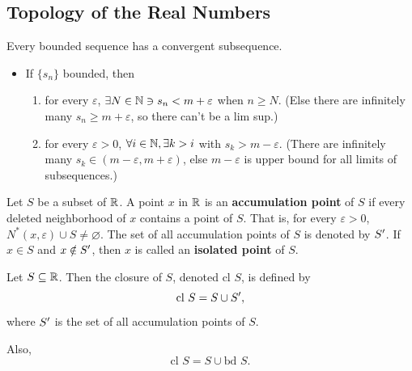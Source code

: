 \documentclass[12pt]{article}
\begin{document}
\subsection{Topology of the Real Numbers}
\label{sec:org80d24c9}
Every bounded sequence has a convergent subsequence.
\begin{itemize}
\item If \(\{s_n\}\) bounded, then
\begin{enumerate}
\item for every \(\varepsilon\), \(\exists N \in \mathbb{N} \ni s_n < m + \varepsilon\) when \(n \ge N\). (Else there
are infinitely  many \(s_n \ge  m + \varepsilon\), so  there can't be  a lim
sup.)
\item for every \(\varepsilon > 0\), \(\forall i \in \mathbb{N}, \exists k>i\) with \(s_k > m - \varepsilon\).
(There are infinitely many  \(s_k \in (m-\varepsilon, m+\varepsilon)\), else
\(m-\varepsilon\) is upper bound for all limits of subsequences.)
\end{enumerate}
\end{itemize}

\begin{definition}
  Let $S$ be a subset of $\mathbb{R}$. A point $x$ in $\mathbb{R}$ is an
  \textbf{accumulation point} of $S$ if every deleted neighborhood of $x$
  contains a point of $S$. That is, for every $\varepsilon > 0$, $N^{*}(x,\varepsilon) \cup S \ne
  \varnothing$. The set of all accumulation points of $S$ is denoted by
  $S'$. If $x\in S$ and $x\notin S'$, then $x$ is called an \textbf{isolated
  point} of $S$.
\end{definition}

\begin{definition}[Closure]
  Let $S \subseteq \mathbb{R}$. Then the closure of $S$, denoted $\text{cl } S$, is
  defined by $$\text{cl } S = S \cup S',$$ where $S'$ is the set of all
  accumulation points of $S$.

  Also, $$\text{cl } S = S \cup \text{bd } S.$$
\end{definition}
\end{document}
